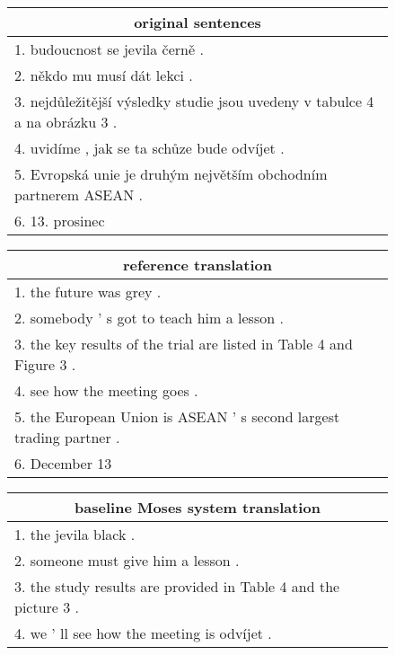 \documentclass{ExcelAtFIT}
\begin{document}
\begin{figure}[h!]
    \begin{center}
        \begin{tabular}{|p{1\linewidth}|}
          \hline
          \multicolumn{1}{|c|}{original sentences} \\
          \hline
          1. budoucnost se jevila černě . \\
          2. někdo mu musí dát lekci . \\
          3. nejdůležitější výsledky studie jsou uvedeny v tabulce 4 a na obrázku 3 . \\
          4. uvidíme , jak se ta schůze bude odvíjet . \\
          5. Evropská unie je druhým největším obchodním partnerem ASEAN . \\
          6. 13. prosinec \\
          \hline
        \end{tabular}
    \end{center}
    \begin{center}
        \begin{tabular}{|p{1\linewidth}|}
          \hline
          \multicolumn{1}{|c|}{reference translation} \\
          \hline
          1. the future was grey . \\
          2. somebody '  s got to teach him a lesson . \\
          3. the key results of the trial are listed in Table 4 and Figure 3 . \\
          4. see how the meeting goes . \\
          5. the European Union is ASEAN '  s second largest trading partner . \\
          6. December 13 \\
          \hline
        \end{tabular}
    \end{center}
    \begin{center}
        \begin{tabular}{|p{1\linewidth}|}
          \hline
          \multicolumn{1}{|c|}{baseline Moses system translation} \\
          \hline
          1. the jevila black .  \\
          2. someone must give him a lesson .  \\
          3. the study results are provided in Table 4 and the picture 3 . \\
          4. we ' ll see how the meeting is odvíjet . \\

\end{tabular}
\end{center}
\end{figure}
\end{document}
